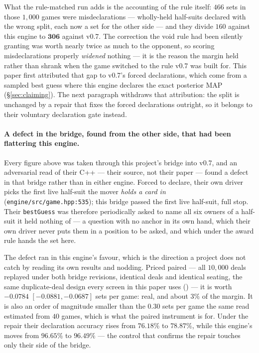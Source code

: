 \documentclass[11pt,a4paper]{article}
\begin{document}
What the rule-matched run adds is the accounting of the rule itself: $466$
sets in those $1{,}000$ games were misdeclarations --- wholly-held
half-suits declared with the wrong split, each now a set for the other side
--- and they divide $160$ against this engine to $\mathbf{306}$ against
v0.7. The correction the void rule had been silently granting was worth
nearly twice as much to the opponent, so scoring misdeclarations properly
\emph{widened} nothing --- it is the reason the margin held rather than
shrank when the game switched to the rule v0.7 was built for. This paper
first attributed that gap to v0.7's forced declarations, which come from a
sampled best guess where this engine declares the exact posterior MAP
(\S\ref{sec:claiming}). The next paragraph withdraws that attribution: the
split is unchanged by a repair that fixes the forced declarations outright,
so it belongs to their voluntary declaration gate instead.

\paragraph{A defect in the bridge, found from the other side, that had been
flattering this engine.} Every figure above was taken through this project's
bridge into v0.7, and an adversarial read of their C++ --- their source, not
their paper --- found a defect in that bridge rather than in either engine.
Forced to declare, their own driver picks the first live half-suit the mover
\emph{holds a card in} (\texttt{engine/src/game.hpp:535}); this bridge passed
the first live half-suit, full stop. Their \texttt{bestGuess} was therefore
periodically asked to name all six owners of a half-suit it held nothing of
--- a question with no anchor in its own hand, which their own driver never
puts them in a position to be asked, and which under the award rule hands
the set here.

The defect ran in this engine's favour, which is the direction a project does
not catch by reading its own results and nodding. Priced paired --- all
$10{,}000$ deals replayed under both bridge revisions, identical deals and
identical seating, the same duplicate-deal design every screen in this paper
uses () --- it is worth $\mathbf{-0.0784}$
$[-0.0881, -0.0687]$ sets per game: real, and about $3\%$ of the margin. It
is also an order of magnitude smaller than the $0.30$ sets per game the same
read estimated from $40$ games, which is what the paired instrument is for.
Under the repair their declaration accuracy rises from $76.18\%$ to
$78.87\%$, while this engine's moves from $96.65\%$ to $96.49\%$ --- the
control that confirms the repair touches only their side of the bridge.
\end{document}
